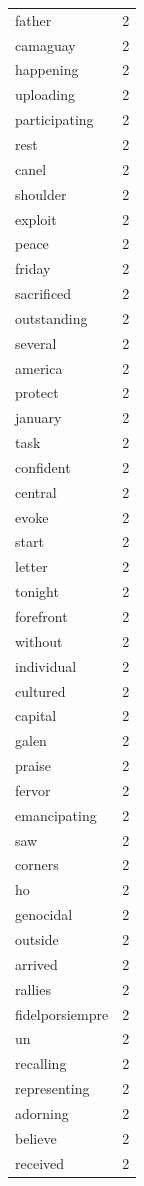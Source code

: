 \begin{tabular}{lr}
father & 2 \\
camaguay & 2 \\
happening & 2 \\
uploading & 2 \\
participating & 2 \\
rest & 2 \\
canel & 2 \\
shoulder & 2 \\
exploit & 2 \\
peace & 2 \\
friday & 2 \\
sacrificed & 2 \\
outstanding & 2 \\
several & 2 \\
america & 2 \\
protect & 2 \\
january & 2 \\
task & 2 \\
confident & 2 \\
central & 2 \\
evoke & 2 \\
start & 2 \\
letter & 2 \\
tonight & 2 \\
forefront & 2 \\
without & 2 \\
individual & 2 \\
cultured & 2 \\
capital & 2 \\
galen & 2 \\
praise & 2 \\
fervor & 2 \\
emancipating & 2 \\
saw & 2 \\
corners & 2 \\
ho & 2 \\
genocidal & 2 \\
outside & 2 \\
arrived & 2 \\
rallies & 2 \\
fidelporsiempre & 2 \\
un & 2 \\
recalling & 2 \\
representing & 2 \\
adorning & 2 \\
believe & 2 \\
received & 2 \\

\end{tabular}
